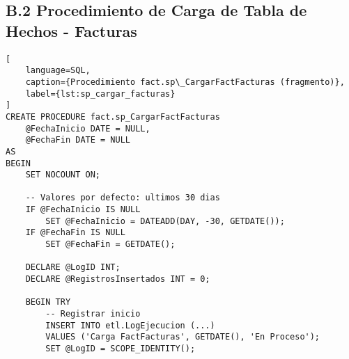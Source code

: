 \subsection{B.2 Procedimiento de Carga de Tabla de Hechos - Facturas}

\begin{lstlisting}[
    language=SQL,
    caption={Procedimiento fact.sp\_CargarFactFacturas (fragmento)},
    label={lst:sp_cargar_facturas}
]
CREATE PROCEDURE fact.sp_CargarFactFacturas
    @FechaInicio DATE = NULL,
    @FechaFin DATE = NULL
AS
BEGIN
    SET NOCOUNT ON;
    
    -- Valores por defecto: ultimos 30 dias
    IF @FechaInicio IS NULL
        SET @FechaInicio = DATEADD(DAY, -30, GETDATE());
    IF @FechaFin IS NULL
        SET @FechaFin = GETDATE();
    
    DECLARE @LogID INT;
    DECLARE @RegistrosInsertados INT = 0;
    
    BEGIN TRY
        -- Registrar inicio
        INSERT INTO etl.LogEjecucion (...)
        VALUES ('Carga FactFacturas', GETDATE(), 'En Proceso');
        SET @LogID = SCOPE_IDENTITY();
        

\end{lstlisting}
